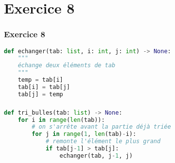 \documentclass[svgnames,11pt]{beamer}
\begin{document}
\section{Exercice 8}
\begin{frame}[fragile]
    \frametitle{Exercice 8}

\begin{center}
\begin{lstlisting}[language=Python , basicstyle=\ttfamily\small, xleftmargin=0.2em, xrightmargin=0em]
def echanger(tab: list, i: int, j: int) -> None:
    """
    échange deux éléments de tab
    """
    temp = tab[i]
    tab[i] = tab[j]
    tab[j] = temp
\end{lstlisting}
\end{center}

\end{frame}
\begin{frame}[fragile]
    \frametitle{}

\begin{center}
\begin{lstlisting}[language=Python , basicstyle=\ttfamily\small, xleftmargin=0.2em, xrightmargin=0em]
def tri_bulles(tab: list) -> None:
    for i in range(len(tab)):
        # on s'arrête avant la partie déjà triée
        for j in range(1, len(tab)-i):
            # remonte l'élément le plus grand
            if tab[j-1] > tab[j]:
                echanger(tab, j-1, j)
\end{lstlisting}
\end{center} 

\end{frame}
\end{document}
